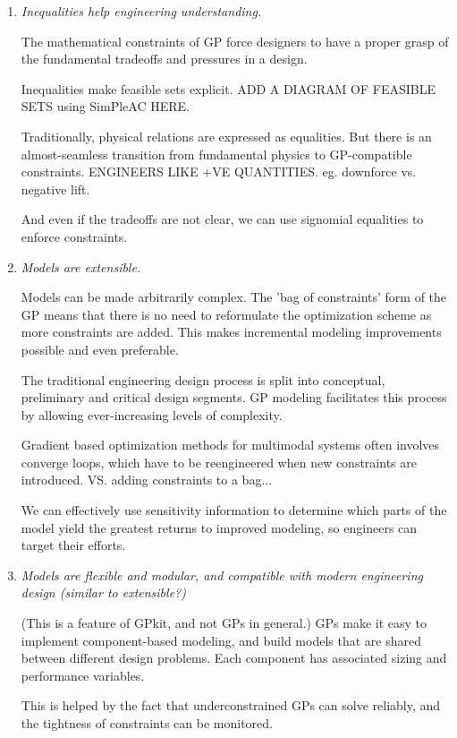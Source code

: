 \begin{enumerate}     \item \textit{Inequalities help engineering
understanding.}

The mathematical constraints of \gls{GP} force designers to have a proper grasp
of the fundamental tradeoffs and pressures in a design.

Inequalities make feasible sets explicit. ADD A DIAGRAM OF FEASIBLE SETS using
SimPleAC HERE.

Traditionally, physical relations are expressed as equalities. But there is an
almost-seamless transition from fundamental physics to GP-compatible
constraints. ENGINEERS LIKE +VE QUANTITIES. eg. downforce vs. negative lift.

And even if the tradeoffs are not clear, we can use signomial equalities to
enforce constraints.

    \item \textit{Models are extensible.}
    
Models can be made arbitrarily complex. The 'bag of constraints' form of the GP
means that there is no need to reformulate the optimization scheme as more
constraints are added. This makes incremental modeling improvements possible and
even preferable.

The traditional engineering design process is split into conceptual, preliminary
and critical design segments. GP modeling facilitates this process by allowing
ever-increasing levels of complexity.

Gradient based optimization methods for multimodal systems often involves
converge loops, which have to be reengineered when new constraints are
introduced. VS. adding constraints to a bag...

We can effectively use sensitivity information to determine which parts of the
model yield the greatest returns to improved modeling, so engineers can target
their efforts.

    \item \textit{Models are flexible and modular, and compatible with modern
    engineering design (similar to extensible?)}

(This is a feature of GPkit, and not GPs in general.) \gls{GP}s make it easy to
implement component-based modeling, and build models that are shared between
different design problems. Each component has associated sizing and performance
variables.

This is helped by the fact that underconstrained \gls{GP}s can solve reliably,
and the tightness of constraints can be monitored.

\end{enumerate}



